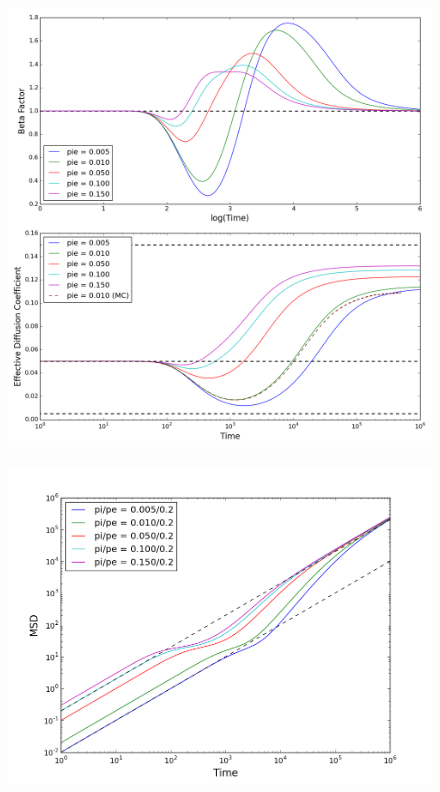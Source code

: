 	\begin{figure}[h]
		\centering
		\includegraphics[width=1.0\linewidth]{../images/2D/pie_beta_deff_2D}
		\caption{}
		\label{fig:pie_beta_deff_2D}
	\end{figure}
	
	\begin{figure}[h]
		\centering
		\includegraphics[width=1.0\linewidth]{../images/2D/pipe_msd_2D}
		\caption{}
		\label{fig:pipe_msd_2D}
	\end{figure}
	
